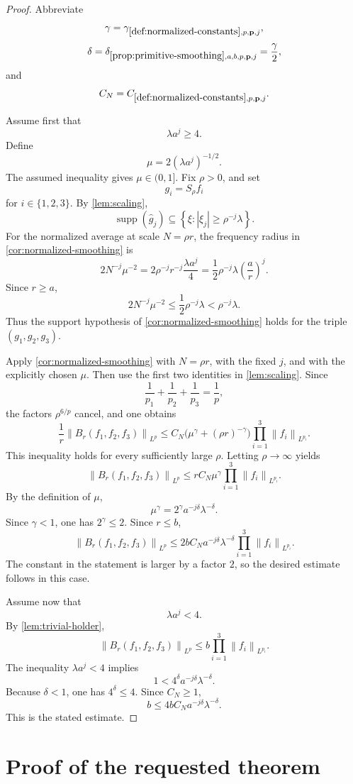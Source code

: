 \documentclass[11pt]{article}
\newcommand{\supp}{\operatorname{supp}}
\newcommand{\norm}[2]{\left\lVert #1\right\rVert_{#2}}
\newcommand{\Cst}[2]{C_{\ref{#1},#2}}
\newcommand{\Exp}[2]{\delta_{\ref{#1},#2}}
\newcommand{\Gam}[2]{\gamma_{\ref{#1},#2}}
\newcommand{\abs}[1]{\left|#1\right|}
\newcommand{\set}[1]{\left\{#1\right\}}
\newcommand{\indices}{\{1,2,3\}}
\begin{document}
\begin{proof}
Abbreviate
\[
\gamma=\Gam{def:normalized-constants}{p,\mathbf p,j},
\]
\[
\delta=\Exp{prop:primitive-smoothing}{a,b,p,\mathbf p,j}=\frac\gamma2,
\]
and
\[
C_N=\Cst{def:normalized-constants}{p,\mathbf p,j}.
\]

Assume first that
\[
\lambda a^j\geq4.
\]
Define
\[
\mu=2(\lambda a^j)^{-1/2}.
\]
The assumed inequality gives \(\mu\in(0,1]\).  Fix \(\rho>0\), and set
\[
g_i=S_\rho f_i
\]
for \(i\in\indices\).  By \cref{lem:scaling},
\[
\supp(\widehat g_j)
\subseteq
\set{\xi:\abs{\xi_j}\geq\rho^{-j}\lambda}.
\]
For the normalized average at scale \(N=\rho r\), the frequency radius in \cref{cor:normalized-smoothing} is
\[
2N^{-j}\mu^{-2}
=
2\rho^{-j}r^{-j}\frac{\lambda a^j}{4}
=
\frac12\rho^{-j}\lambda\left(\frac ar\right)^j.
\]
Since \(r\geq a\),
\[
2N^{-j}\mu^{-2}\leq\frac12\rho^{-j}\lambda<\rho^{-j}\lambda.
\]
Thus the support hypothesis of \cref{cor:normalized-smoothing} holds for the triple \((g_1,g_2,g_3)\).

Apply \cref{cor:normalized-smoothing} with \(N=\rho r\), with the fixed \(j\), and with the explicitly chosen \(\mu\).  Then use the first two identities in \cref{lem:scaling}.  Since
\[
\frac1{p_1}+\frac1{p_2}+\frac1{p_3}=\frac1p,
\]
the factors \(\rho^{6/p}\) cancel, and one obtains
\[
\frac1r\norm{B_r(f_1,f_2,f_3)}{L^p}
\leq
C_N\bigl(\mu^\gamma+(\rho r)^{-\gamma}\bigr)
\prod_{i=1}^{3}\norm{f_i}{L^{p_i}}.
\]
This inequality holds for every sufficiently large \(\rho\).  Letting \(\rho\to\infty\) yields
\[
\norm{B_r(f_1,f_2,f_3)}{L^p}
\leq
rC_N\mu^\gamma
\prod_{i=1}^{3}\norm{f_i}{L^{p_i}}.
\]
By the definition of \(\mu\),
\[
\mu^\gamma=2^\gamma a^{-j\delta}\lambda^{-\delta}.
\]
Since \(\gamma<1\), one has \(2^\gamma\leq2\).  Since \(r\leq b\),
\[
\norm{B_r(f_1,f_2,f_3)}{L^p}
\leq
2bC_Na^{-j\delta}\lambda^{-\delta}
\prod_{i=1}^{3}\norm{f_i}{L^{p_i}}.
\]
The constant in the statement is larger by a factor \(2\), so the desired estimate follows in this case.

Assume now that
\[
\lambda a^j<4.
\]
By \cref{lem:trivial-holder},
\[
\norm{B_r(f_1,f_2,f_3)}{L^p}
\leq
b\prod_{i=1}^{3}\norm{f_i}{L^{p_i}}.
\]
The inequality \(\lambda a^j<4\) implies
\[
1<4^\delta a^{-j\delta}\lambda^{-\delta}.
\]
Because \(\delta<1\), one has \(4^\delta\leq4\).  Since \(C_N\geq1\),
\[
b
\leq
4bC_Na^{-j\delta}\lambda^{-\delta}.
\]
This is the stated estimate.
\end{proof}

\section{Proof of the requested theorem}\label{sec:main-proof}
\end{document}
